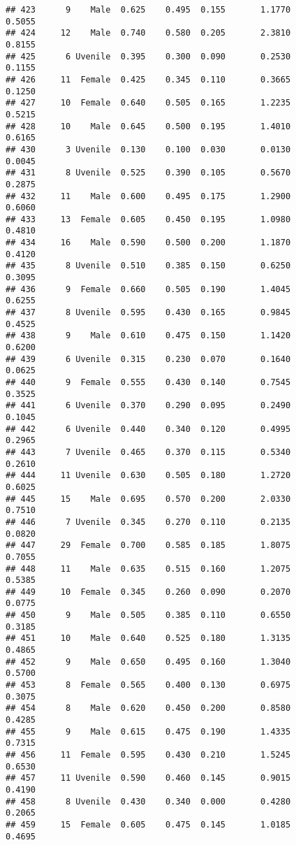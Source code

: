 \documentclass[
]{article}
\begin{document}
\begin{verbatim}
## 423      9    Male  0.625    0.495  0.155       1.1770         0.5055
## 424     12    Male  0.740    0.580  0.205       2.3810         0.8155
## 425      6 Uvenile  0.395    0.300  0.090       0.2530         0.1155
## 426     11  Female  0.425    0.345  0.110       0.3665         0.1250
## 427     10  Female  0.640    0.505  0.165       1.2235         0.5215
## 428     10    Male  0.645    0.500  0.195       1.4010         0.6165
## 430      3 Uvenile  0.130    0.100  0.030       0.0130         0.0045
## 431      8 Uvenile  0.525    0.390  0.105       0.5670         0.2875
## 432     11    Male  0.600    0.495  0.175       1.2900         0.6060
## 433     13  Female  0.605    0.450  0.195       1.0980         0.4810
## 434     16    Male  0.590    0.500  0.200       1.1870         0.4120
## 435      8 Uvenile  0.510    0.385  0.150       0.6250         0.3095
## 436      9  Female  0.660    0.505  0.190       1.4045         0.6255
## 437      8 Uvenile  0.595    0.430  0.165       0.9845         0.4525
## 438      9    Male  0.610    0.475  0.150       1.1420         0.6200
## 439      6 Uvenile  0.315    0.230  0.070       0.1640         0.0625
## 440      9  Female  0.555    0.430  0.140       0.7545         0.3525
## 441      6 Uvenile  0.370    0.290  0.095       0.2490         0.1045
## 442      6 Uvenile  0.440    0.340  0.120       0.4995         0.2965
## 443      7 Uvenile  0.465    0.370  0.115       0.5340         0.2610
## 444     11 Uvenile  0.630    0.505  0.180       1.2720         0.6025
## 445     15    Male  0.695    0.570  0.200       2.0330         0.7510
## 446      7 Uvenile  0.345    0.270  0.110       0.2135         0.0820
## 447     29  Female  0.700    0.585  0.185       1.8075         0.7055
## 448     11    Male  0.635    0.515  0.160       1.2075         0.5385
## 449     10  Female  0.345    0.260  0.090       0.2070         0.0775
## 450      9    Male  0.505    0.385  0.110       0.6550         0.3185
## 451     10    Male  0.640    0.525  0.180       1.3135         0.4865
## 452      9    Male  0.650    0.495  0.160       1.3040         0.5700
## 453      8  Female  0.565    0.400  0.130       0.6975         0.3075
## 454      8    Male  0.620    0.450  0.200       0.8580         0.4285
## 455      9    Male  0.615    0.475  0.190       1.4335         0.7315
## 456     11  Female  0.595    0.430  0.210       1.5245         0.6530
## 457     11 Uvenile  0.590    0.460  0.145       0.9015         0.4190
## 458      8 Uvenile  0.430    0.340  0.000       0.4280         0.2065
## 459     15  Female  0.605    0.475  0.145       1.0185         0.4695

\end{verbatim}
\end{document}
